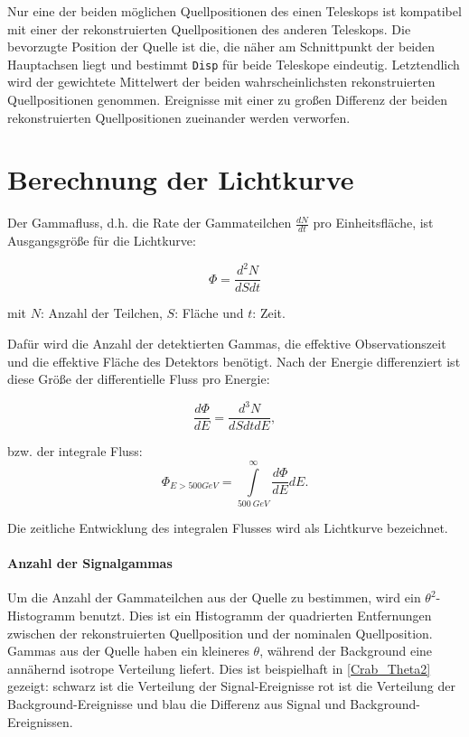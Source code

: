 Nur eine der beiden möglichen Quellpositionen des einen Teleskops ist kompatibel mit einer der rekonstruierten Quellpositionen des anderen Teleskops. 
Die bevorzugte Position der Quelle ist die, die näher am Schnittpunkt der beiden Hauptachsen liegt und bestimmt \texttt{Disp} für beide Teleskope eindeutig.
Letztendlich wird der gewichtete Mittelwert der beiden wahrscheinlichsten rekonstruierten Quellpositionen genommen.
Ereignisse mit einer zu großen Differenz der beiden rekonstruierten Quellpositionen zueinander werden verworfen.



\section{Berechnung der Lichtkurve}
\label{sec:Lichtkurve}
Der Gammafluss, d.h. die Rate der Gammateilchen $\frac{dN}{dt}$ pro Einheitsfläche, ist Ausgangsgröße für die Lichtkurve:

\begin{equation}
 \Phi=\frac{d^2 N}{dS dt} 
\end{equation}
\begin{centering}
  \small{mit $N$: Anzahl der Teilchen, $S$: Fläche und $t$: Zeit.}
 \end{centering}
 
Dafür wird die Anzahl der detektierten Gammas, die effektive Observationszeit und die effektive Fläche des Detektors benötigt.
Nach der Energie differenziert ist diese Größe der differentielle Fluss pro Energie:

\begin{equation}
 \frac{d\Phi}{dE}=\frac{d^3N}{dSdtdE},
\end{equation}

bzw. der integrale Fluss:
\begin{equation}
 \Phi_{E>500GeV}=\int\limits_{\SI{500}{GeV}}^{\infty}\frac{d\Phi}{dE}dE.
\end{equation}


Die zeitliche Entwicklung des integralen Flusses wird als Lichtkurve bezeichnet.

\paragraph{Anzahl der Signalgammas}
Um die Anzahl der Gammateilchen aus der Quelle zu bestimmen, wird ein $\theta^2$-Histogramm benutzt.
Dies ist ein Histogramm der quadrierten Entfernungen zwischen der rekonstruierten Quellposition und der nominalen Quellposition.
Gammas aus der Quelle haben ein kleineres $\theta$, während der Background eine annähernd isotrope Verteilung liefert. 
Dies ist beispielhaft in \autoref{Crab_Theta2} gezeigt: schwarz ist die Verteilung der Signal-Ereignisse rot ist die Verteilung der Background-Ereignisse und blau die Differenz aus Signal und Background-Ereignissen. 

